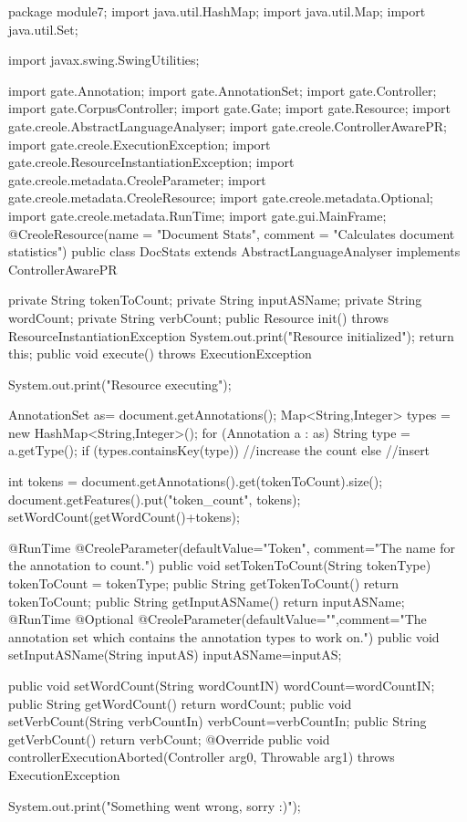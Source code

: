 package module7;
import java.util.HashMap;
import java.util.Map;
import java.util.Set;

import javax.swing.SwingUtilities;

import gate.Annotation;
import gate.AnnotationSet;
import gate.Controller;
import gate.CorpusController;
import gate.Gate;
import gate.Resource;
import gate.creole.AbstractLanguageAnalyser;
import gate.creole.ControllerAwarePR;
import gate.creole.ExecutionException;
import gate.creole.ResourceInstantiationException;
import gate.creole.metadata.CreoleParameter;
import gate.creole.metadata.CreoleResource;
import gate.creole.metadata.Optional;
import gate.creole.metadata.RunTime;
import gate.gui.MainFrame;
@CreoleResource(name = "Document Stats", comment = "Calculates document statistics")
public class DocStats extends AbstractLanguageAnalyser implements ControllerAwarePR{

	private String tokenToCount;
	private String inputASName;
	private String wordCount;
	private String verbCount;
	public Resource init()
		throws ResourceInstantiationException{
		System.out.print("Resource initialized");
		return this; 
	}
	public void execute()
		throws ExecutionException{
		System.out.print("Resource executing");
		
		AnnotationSet as= document.getAnnotations();
		Map<String,Integer> types = new HashMap<String,Integer>();
		for (Annotation a : as){
			String type = a.getType();
			if (types.containsKey(type)){
				//increase the count
			}else{
				//insert
			}
		}
		
		int tokens = document.getAnnotations().get(tokenToCount).size();
		document.getFeatures().put("token_count", tokens);
		setWordCount(getWordCount()+tokens);
		
	}
	@RunTime
	@CreoleParameter(defaultValue="Token", comment="The name for the annotation to count.")
	public void setTokenToCount(String tokenType){
		tokenToCount = tokenType;
	}
	public String getTokenToCount(){
		return tokenToCount;
	}
	public String getInputASName(){
		return inputASName;
	}
	@RunTime
	@Optional
	@CreoleParameter(defaultValue="",comment="The annotation set which contains the annotation types to work on.")
	public void setInputASName(String inputAS){
		inputASName=inputAS;
	}
	
	
	public void setWordCount(String wordCountIN){
		wordCount=wordCountIN;
	}
	public String getWordCount(){
		return wordCount;
	}
	public void setVerbCount(String verbCountIn){
		verbCount=verbCountIn;
	}
	public String getVerbCount(){
		return verbCount;
	}
	@Override
	public void controllerExecutionAborted(Controller arg0, Throwable arg1)
			throws ExecutionException {
		System.out.print("Something went wrong, sorry :)");
		
}}
